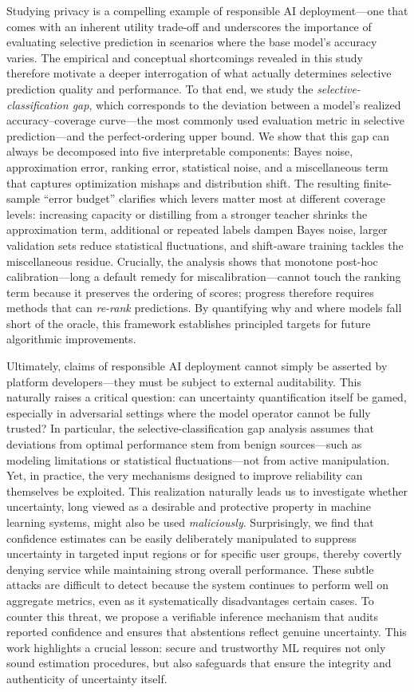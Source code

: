 Studying privacy is a compelling example of responsible AI deployment—one that comes with an inherent utility trade-off and underscores the importance of evaluating selective prediction in scenarios where the base model's accuracy varies. The empirical and conceptual shortcomings revealed in this study therefore motivate a deeper interrogation of what actually determines selective prediction quality and performance. To that end, we study the \emph{selective-classification gap}, which corresponds to the deviation between a model's realized accuracy–coverage curve---the most commonly used evaluation metric in selective prediction---and the perfect-ordering upper bound. We show that this gap can always be decomposed into five interpretable components: Bayes noise, approximation error, ranking error, statistical noise, and a miscellaneous term that captures optimization mishaps and distribution shift. The resulting finite-sample “error budget” clarifies which levers matter most at different coverage levels: increasing capacity or distilling from a stronger teacher shrinks the approximation term, additional or repeated labels dampen Bayes noise, larger validation sets reduce statistical fluctuations, and shift-aware training tackles the miscellaneous residue. Crucially, the analysis shows that monotone post-hoc calibration—long a default remedy for miscalibration—cannot touch the ranking term because it preserves the ordering of scores; progress therefore requires methods that can \emph{re-rank} predictions. By quantifying why and where models fall short of the oracle, this framework establishes principled targets for future algorithmic improvements.

Ultimately, claims of responsible AI deployment cannot simply be asserted by platform developers—they must be subject to external auditability. This naturally raises a critical question: can uncertainty quantification itself be gamed, especially in adversarial settings where the model operator cannot be fully trusted? In particular, the selective-classification gap analysis assumes that deviations from optimal performance stem from benign sources—such as modeling limitations or statistical fluctuations—not from active manipulation. Yet, in practice, the very mechanisms designed to improve reliability can themselves be exploited. This realization naturally leads us to investigate whether uncertainty, long viewed as a desirable and protective property in machine learning systems, might also be used \emph{maliciously}. Surprisingly, we find that confidence estimates can be easily deliberately manipulated to suppress uncertainty in targeted input regions or for specific user groups, thereby covertly denying service while maintaining strong overall performance. These subtle attacks are difficult to detect because the system continues to perform well on aggregate metrics, even as it systematically disadvantages certain cases. To counter this threat, we propose a verifiable inference mechanism that audits reported confidence and ensures that abstentions reflect genuine uncertainty. This work highlights a crucial lesson: secure and trustworthy ML requires not only sound estimation procedures, but also safeguards that ensure the integrity and authenticity of uncertainty itself.

